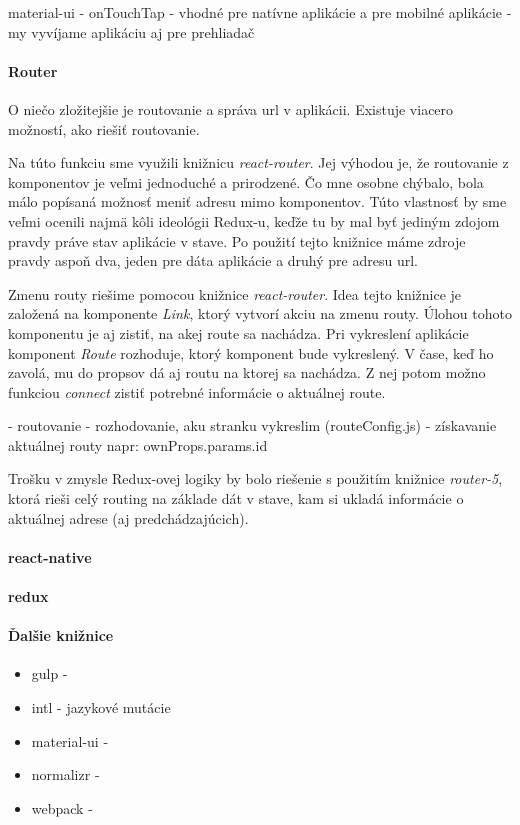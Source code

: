 material-ui
- onTouchTap
- vhodné pre natívne aplikácie a pre mobilné aplikácie
- my vyvíjame aplikáciu aj pre prehliadač

\paragraph{Router}%
O niečo zložitejšie je routovanie a správa url v aplikácii. Existuje viacero možností, ako riešiť routovanie. 

Na túto funkciu sme využili knižnicu \emph{react-router}. Jej výhodou je, že routovanie z komponentov je veľmi jednoduché a prirodzené. Čo mne osobne chýbalo, bola málo popísaná možnosť meniť adresu mimo komponentov. Túto vlastnosť by sme veľmi ocenili najmä kôli ideológii Redux-u, keďže tu by mal byť jediným zdojom pravdy práve stav aplikácie v stave. Po použití tejto knižnice máme zdroje pravdy aspoň dva, jeden pre dáta aplikácie a druhý pre adresu url. %

\TODO{} Zmenu routy riešime pomocou knižnice \emph{react-router}. %
Idea tejto knižnice je založená na komponente \emph{Link}, ktorý vytvorí akciu na zmenu routy. Úlohou tohoto komponentu je aj zistiť, na akej route sa nachádza. 
Pri vykreslení aplikácie komponent \emph{Route} rozhoduje, ktorý komponent bude vykreslený. V čase, keď ho zavolá, mu do propsov dá aj routu na ktorej sa nachádza. Z nej potom možno funkciou \emph{connect} zistiť potrebné informácie o aktuálnej route. %

\TODO{}
- routovanie
  - rozhodovanie, aku stranku vykreslim (routeConfig.js)
  - získavanie aktuálnej routy %
  napr: ownProps.params.id


Trošku  v zmysle Redux-ovej logiky by bolo riešenie s použitím knižnice \emph{router-5}, ktorá rieši celý routing na základe dát v stave, kam si ukladá informácie o aktuálnej adrese (aj predchádzajúcich).

\cite[Redux]{Redux}

\paragraph{react-native}
\TODO{}

\paragraph{redux}
\TODO{}

\paragraph{Ďalšie knižnice}
\begin{itemize}
  \item gulp - \TODO{}
  \item intl - jazykové mutácie \TODO{}
  \item material-ui - \TODO{}
  \item normalizr - \TODO{}
  \item webpack - \TODO{}
\end{itemize}